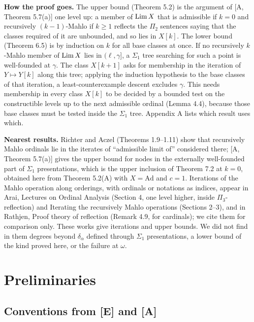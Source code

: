 \documentclass[11pt]{article}
\begin{document}
\textbf{How the proof goes.} The upper bound (Theorem 5.2) is the argument of [A, Theorem 5.7(a)] one level up: a
member of $\mathrm{Lim}\, X$ that is admissible if $k = 0$ and recursively $(k-1)$-Mahlo if $k \ge 1$ reflects the $\Pi_2$ sentences saying that the classes required of it are
unbounded, and so lies in $X[k]$. The lower bound (Theorem 6.5) is by induction on $k$ for all base classes at once. If
no recursively $k$-Mahlo member of $\mathrm{Lim}\, X$ lies in $(\ell, \gamma]$, a $\Sigma_1$ tree searching for such a point is
well-founded at $\gamma$. The class $X[k+1]$ asks for membership in the iteration of $Y \mapsto Y[k]$ along this tree;
applying the induction hypothesis to the base classes of that iteration, a least-counterexample descent excludes
$\gamma$. This needs membership in every class $X[k]$ to be decided by a bounded test on the constructible levels up to
the next admissible ordinal (Lemma 4.4), because those base classes must be tested inside the $\Sigma_1$ tree.
Appendix A lists which result uses which.

\textbf{Nearest results.} Richter and Aczel (Theorems 1.9--1.11) show that recursively Mahlo ordinals lie in the
iterates of ``admissible limit of'' considered there; [A, Theorem 5.7(a)] gives the upper bound for nodes in the
externally well-founded part of $\Sigma_1$ presentations, which is the upper inclusion of Theorem 7.2 at $k = 0$, obtained here from Theorem 5.2(A) with $X = \mathrm{Ad}$ and $c = 1$. Iterations of the Mahlo operation
along orderings, with ordinals or notations as indices, appear in Arai, Lectures on Ordinal Analysis (Section 4, one
level higher, inside $\Pi_3$-reflection) and Iterating the recursively Mahlo operations (Sections 2--3), and in Rathjen,
Proof theory of reflection (Remark 4.9, for cardinals); we cite them for comparison only. These works give iterations
and upper bounds. We did not find in them degrees beyond $\delta_\alpha$ defined through $\Sigma_1$ presentations, a
lower bound of the kind proved here, or the failure at $\omega$.

\section{Preliminaries}

\subsection{\texorpdfstring{Conventions from [E] and [A]}{Conventions from [E] and [A]}}
\end{document}
